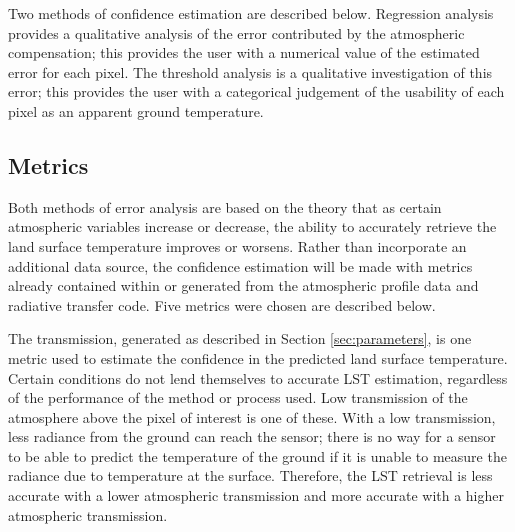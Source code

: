 \documentclass{book}
\begin{document}
Two methods of confidence estimation are described below.  Regression analysis provides a qualitative analysis of the error contributed by the atmospheric compensation; this provides the user with a numerical value of the estimated error for each pixel.  The threshold analysis is a qualitative investigation of this error; this provides the user with a categorical judgement of the usability of each pixel as an apparent ground temperature.

\subsection{Metrics}
\label{sec:metrics}

Both methods of error analysis are based on the theory that as certain atmospheric variables increase or decrease, the ability to accurately retrieve the land surface temperature improves or worsens.  Rather than incorporate an additional data source, the confidence estimation will be made with metrics already contained within or generated from the atmospheric profile data and radiative transfer code.  Five metrics were chosen are described below.

The transmission, generated as described in Section \ref{sec:parameters}, is one metric used to estimate the confidence in the predicted land surface temperature.  Certain conditions do not lend themselves to accurate LST estimation, regardless of the performance of the method or process used.  Low transmission of the atmosphere above the pixel of interest is one of these.  With a low transmission, less radiance from the ground can reach the sensor; there is no way for a sensor to be able to predict the temperature of the ground if it is unable to measure the radiance due to temperature at the surface.  Therefore, the LST retrieval is less accurate with a lower atmospheric transmission and more accurate with a higher atmospheric transmission.
\end{document}
